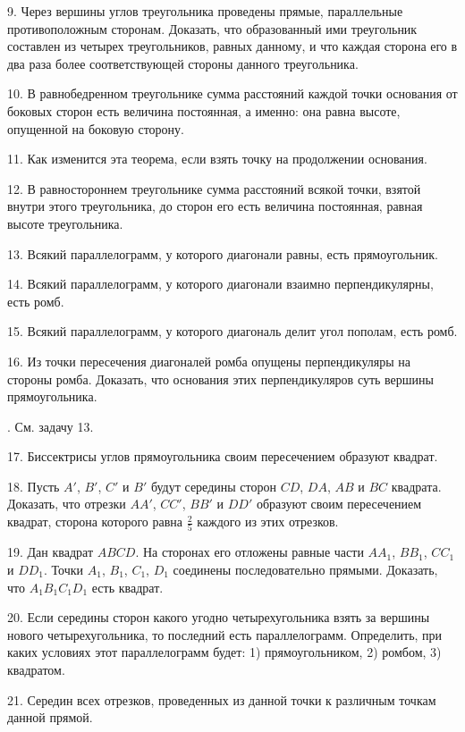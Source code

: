 \documentclass[oneside]{book}
\begin{document}
9.
Через вершины углов треугольника проведены прямые, параллельные противоположным сторонам.
Доказать, что образованный ими треугольник составлен из четырех треугольников, равных данному, и что каждая сторона его в два раза более соответствующей стороны данного треугольника.

10.
В равнобедренном треугольнике сумма расстояний каждой точки основания от боковых сторон есть величина постоянная, а именно:
она равна высоте, опущенной на боковую сторону.

11.
Как изменится эта теорема, если взять точку на продолжении основания.

12.
В равностороннем треугольнике сумма расстояний всякой точки, взятой внутри этого треугольника, до сторон его есть величина постоянная, равная высоте треугольника.

13.
Всякий параллелограмм, у которого диагонали равны, есть прямоугольник.

14.
Всякий параллелограмм, у которого диагонали взаимно перпендикулярны, есть ромб.

15.
Всякий параллелограмм, у которого диагональ делит угол пополам, есть ромб.

16.
Из точки пересечения диагоналей ромба опущены перпендикуляры на стороны ромба.
Доказать, что основания этих перпендикуляров суть вершины прямоугольника.

.
См.
задачу 13.

17.
Биссектрисы углов прямоугольника своим пересечением образуют квадрат.

18.
Пусть $A'$, $B'$, $C'$ и $B'$ будут середины сторон $CD$, $DA$, $AB$ и $BC$ квадрата.
Доказать, что отрезки $AA'$, $CC'$, $BB'$ и $DD'$ образуют своим пересечением квадрат, сторона которого равна $\tfrac25$ каждого из этих отрезков.

19.
Дан квадрат $ABCD$.
На сторонах его отложены равные части $AA_1$, $BB_1$, $CC_1$ и $DD_1$.
Точки $A_1$, $B_1$, $C_1$, $D_1$ соединены последовательно прямыми.
Доказать, что $A_1B_1C_1D_1$ есть квадрат.

20.
Если середины сторон какого угодно четырехугольника взять за вершины нового четырехугольника, то последний есть параллелограмм.
Определить, при каких условиях этот параллелограмм будет:
1) прямоугольником, 2) ромбом, 3) квадратом.


21.
Середин всех отрезков, проведенных из данной точки к различным точкам данной прямой.
\end{document}
